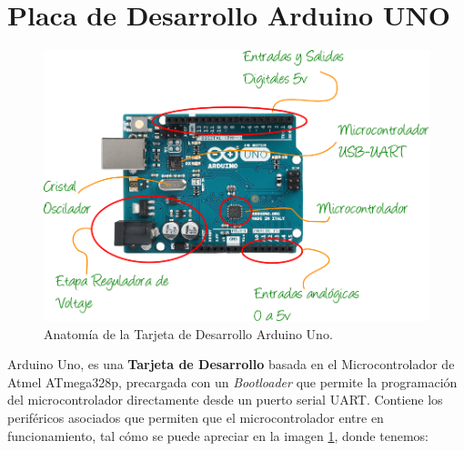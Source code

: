 \documentclass[letterpaper, 10pt]{report}
\begin{document}
\section{Placa de Desarrollo Arduino UNO}
	\begin{figure}[h]
		\centering
		\includegraphics[scale=0.6]{anatomiaArduino.png}
		\caption{Anatomía de la Tarjeta de Desarrollo Arduino Uno. \label{anatomiaArduino}}	
	\end{figure}			
		
		Arduino Uno, es una \textbf{Tarjeta de Desarrollo} basada en el Microcontrolador de Atmel ATmega328p, precargada con un \emph{Bootloader} que permite la programación del microcontrolador directamente desde un puerto serial UART. Contiene los periféricos asociados que permiten que el microcontrolador entre en funcionamiento, tal cómo se puede apreciar en la imagen \ref{anatomiaArduino}, donde tenemos:
		
\end{document}
